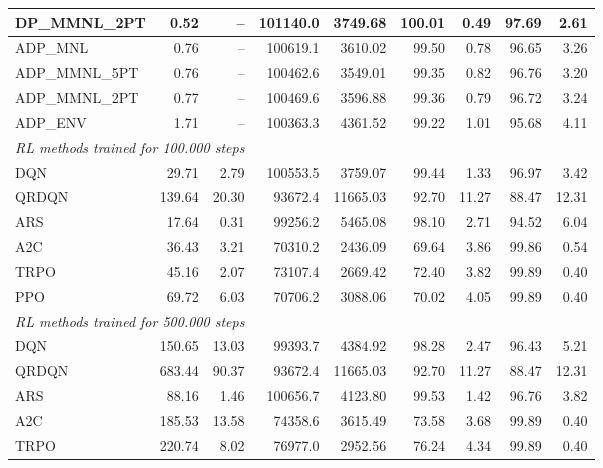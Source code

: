 \begin{samepage}
\begin{center}
\begin{tabular}{l|rr|rr|rr|rr}
    DP\_MMNL\_2PT &     0.52 &    -- &   101140.0 &    3749.68 &  100.01 &    0.49 &   97.69 &    2.61 \\
    \midrule
    ADP\_MNL     &     0.76 &    -- &   100619.1 &    3610.02 &   99.50 &    0.78 &   96.65 &    3.26 \\
    ADP\_MMNL\_5PT &     0.76 &    -- &   100462.6 &    3549.01 &   99.35 &    0.82 &   96.76 &    3.20 \\
    ADP\_MMNL\_2PT &     0.77 &    -- &   100469.6 &    3596.88 &   99.36 &    0.79 &   96.72 &    3.24 \\
    ADP\_ENV     &     1.71 &    -- &   100363.3 &    4361.52 &   99.22 &    1.01 &   95.68 &    4.11 \\
    \midrule
    \multicolumn{9}{l}{\textit{RL methods trained for 100.000 steps}} \\
    \midrule
    DQN          &    29.71 &     2.79 &   100553.5 &    3759.07 &   99.44 &    1.33 &   96.97 &    3.42 \\
    QRDQN        &   139.64 &    20.30 &    93672.4 &   11665.03 &   92.70 &   11.27 &   88.47 &   12.31 \\
    ARS          &    17.64 &     0.31 &    99256.2 &    5465.08 &   98.10 &    2.71 &   94.52 &    6.04 \\
    A2C          &    36.43 &     3.21 &    70310.2 &    2436.09 &   69.64 &    3.86 &   99.86 &    0.54 \\
    TRPO         &    45.16 &     2.07 &    73107.4 &    2669.42 &   72.40 &    3.82 &   99.89 &    0.40 \\
    PPO          &    69.72 &     6.03 &    70706.2 &    3088.06 &   70.02 &    4.05 &   99.89 &    0.40 \\
    \midrule
    \multicolumn{9}{l}{\textit{RL methods trained for 500.000 steps}} \\
    \midrule
    DQN          &   150.65 &    13.03 &    99393.7 &    4384.92 &   98.28 &    2.47 &   96.43 &    5.21 \\
    QRDQN        &   683.44 &    90.37 &    93672.4 &   11665.03 &   92.70 &   11.27 &   88.47 &   12.31 \\
    ARS          &    88.16 &     1.46 &   100656.7 &    4123.80 &   99.53 &    1.42 &   96.76 &    3.82 \\
    A2C          &   185.53 &    13.58 &    74358.6 &    3615.49 &   73.58 &    3.68 &   99.89 &    0.40 \\
    TRPO         &   220.74 &     8.02 &    76977.0 &    2952.56 &   76.24 &    4.34 &   99.89 &    0.40 \\

\end{tabular}
\end{center}
\end{samepage}
